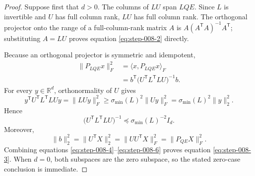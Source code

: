 \begin{proof}
Suppose first that \(d>0\). The columns of
\(LU\) span \(LQE\). Since \(L\) is invertible and \(U\) has full column
rank, \(LU\) has full column rank. The orthogonal projector onto the range of
a full-column-rank matrix \(A\) is
\(A(A^{\mathsf T}A)^{-1}A^{\mathsf T}\); substituting \(A=LU\) proves
equation \eqref{eq:step-008-2} directly.

Because an orthogonal projector is symmetric and idempotent,
\begin{equation}
\begin{aligned}
  \|P_{LQE}x\|_F^2
  &=\langle x,P_{LQE}x\rangle_F\\
  &=b^{\mathsf T}\bigl(U^{\mathsf T}L^{\mathsf T}LU\bigr)^{-1}b.
\end{aligned}\label{eq:step-008-4}
\end{equation}
For every \(y\in\mathbb R^d\), orthonormality of \(U\) gives
\[
  y^{\mathsf T}U^{\mathsf T}L^{\mathsf T}LUy
  =\|LUy\|_F^2
  \ge\sigma_{\min}(L)^2\|Uy\|_F^2
  =\sigma_{\min}(L)^2\|y\|_2^2.
\]
Hence
\begin{equation}
  \bigl(U^{\mathsf T}L^{\mathsf T}LU\bigr)^{-1}
  \preceq\sigma_{\min}(L)^{-2}I_d.                         \label{eq:step-008-5}
\end{equation}
Moreover,
\begin{equation}
  \|b\|_2^2=\|U^{\mathsf T}X\|_2^2
  =\|UU^{\mathsf T}X\|_F^2
  =\|P_{QE}X\|_F^2.                                       \label{eq:step-008-6}
\end{equation}
Combining equations \eqref{eq:step-008-4}--\eqref{eq:step-008-6} proves equation \eqref{eq:step-008-3}. When \(d=0\), both
subspaces are the zero subspace, so the stated zero-case conclusion is
immediate. 

\end{proof}



